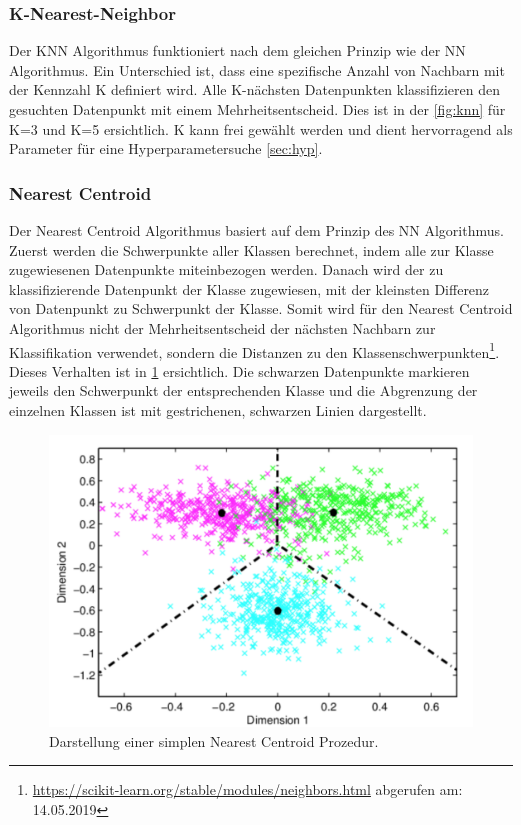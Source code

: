 \subsubsection{K-Nearest-Neighbor}
Der KNN Algorithmus funktioniert nach dem gleichen Prinzip wie der NN Algorithmus.
Ein Unterschied ist, dass eine spezifische Anzahl von Nachbarn mit der Kennzahl K definiert wird.
Alle K-nächsten Datenpunkten klassifizieren den gesuchten Datenpunkt mit einem Mehrheitsentscheid.
Dies ist in der \cref{fig:knn} für K=3 und K=5 ersichtlich.
K kann frei gewählt werden und dient hervorragend als Parameter für eine Hyperparametersuche \cref{sec:hyp}\cite{cover1967nearest}.
\subsubsection{Nearest Centroid}
Der Nearest Centroid Algorithmus basiert auf dem Prinzip des NN Algorithmus.
Zuerst werden die Schwerpunkte aller Klassen berechnet, indem alle zur Klasse zugewiesenen Datenpunkte miteinbezogen werden.
Danach wird der zu klassifizierende Datenpunkt der Klasse zugewiesen, mit der kleinsten Differenz von Datenpunkt zu Schwerpunkt der Klasse.
Somit wird für den Nearest Centroid Algorithmus nicht der Mehrheitsentscheid der nächsten Nachbarn zur Klassifikation verwendet, sondern die Distanzen zu den Klassenschwerpunkten\footnote{\url{https://scikit-learn.org/stable/modules/neighbors.html} abgerufen am: 14.05.2019}\cite{scikit-learn}.
Dieses Verhalten ist in \cref{fig:centroid} ersichtlich.
Die schwarzen Datenpunkte markieren jeweils den Schwerpunkt der entsprechenden Klasse und die Abgrenzung der einzelnen Klassen ist mit gestrichenen, schwarzen Linien dargestellt.
\begin{figure}[H]	
	\includegraphics[width=0.7\columnwidth,keepaspectratio]{img/centroid.png}
	\caption{Darstellung einer simplen Nearest Centroid Prozedur.}
	\label{fig:centroid}
\end{figure}
